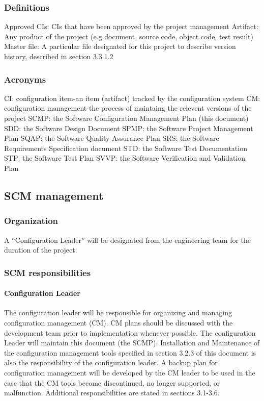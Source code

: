 \documentclass{scrartcl}
\begin{document}
\subsubsection{Definitions}
Approved CIs: CIs that have been approved by the project management \newline
Artifact: Any product of the project (e.g document, source code, object code, test result) \newline
Master file: A particular file designated for this project to describe version history, described in section 3.3.1.2
\subsubsection{Acronyms}
CI: configuration item-an item (artifact) tracked by the configuration system \newline
CM: configuration management-the process of maintaing the relevent versions of the project \newline
SCMP: the Software Configuration Management Plan (this document)\newline
SDD: the Software Design Document \newline
SPMP: the Software Project Management Plan \newline
SQAP: the Software Quality Assurance Plan \newline
SRS: the Software Requirements Specification document \newline
STD: the Software Test Documentation \newline
STP: the Software Test Plan \newline
SVVP: the Software Verification and Validation Plan 
\subsection{SCM management}
\subsubsection{Organization}
A ``Configuration Leader'' will be designated from the engineering team for the duration of the project.
\subsubsection{SCM responsibilities}
\paragraph{Configuration Leader}
The configuration leader will be responsible for organizing and managing configuration management (CM).  CM plans should be discussed with the development team prior to implementation whenever possible.  The configuration Leader will maintain this document (the SCMP).  Installation and Maintenance of the configuration management tools specified in section 3.2.3 of this document is also the responsibility of the configuration leader.  A backup plan for configuration management will be developed by the CM leader to be used in the case that the CM tools become discontinued, no longer supported, or malfunction.
Additional responsibilities are stated in sections 3.1-3.6.
\end{document}
